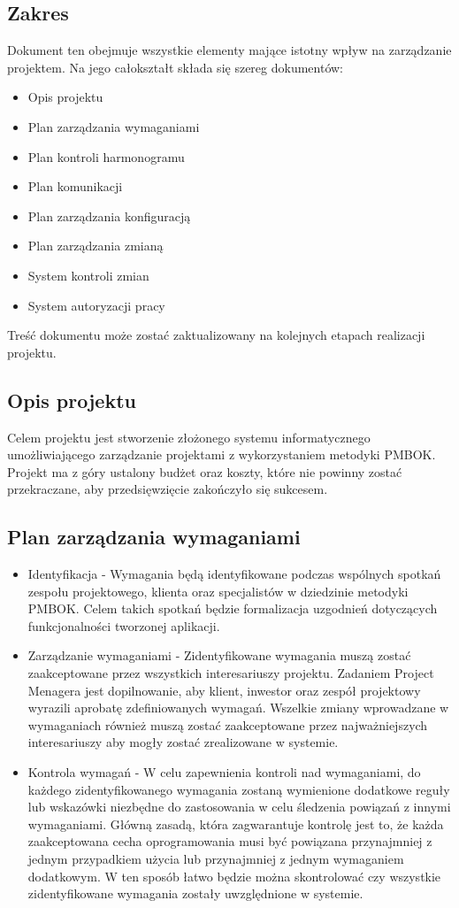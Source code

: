\subsection*{Zakres}
Dokument ten obejmuje wszystkie elementy mające istotny wpływ na zarządzanie projektem.
Na jego całokształt składa się szereg dokumentów:
\begin{itemize}
	\item Opis projektu
	\item Plan zarządzania wymaganiami
	\item Plan kontroli harmonogramu
	\item Plan komunikacji
	\item Plan zarządzania konfiguracją
	\item Plan zarządzania zmianą
	\item System kontroli zmian
	\item System autoryzacji pracy
\end{itemize}
Treść dokumentu może zostać zaktualizowany na kolejnych etapach realizacji projektu.

\subsection*{Opis projektu}
Celem projektu jest stworzenie złożonego systemu informatycznego umożliwiającego zarządzanie projektami z wykorzystaniem metodyki PMBOK. Projekt ma z góry ustalony budżet oraz koszty, które nie powinny zostać przekraczane, aby przedsięwzięcie zakończyło się sukcesem.

\subsection*{Plan zarządzania wymaganiami}
\begin{itemize}
	\item Identyfikacja - Wymagania będą identyfikowane podczas wspólnych spotkań zespołu projektowego, klienta oraz specjalistów w dziedzinie metodyki PMBOK. Celem takich spotkań będzie formalizacja uzgodnień dotyczących funkcjonalności tworzonej aplikacji.
	\item Zarządzanie wymaganiami - Zidentyfikowane wymagania muszą zostać zaakceptowane przez wszystkich interesariuszy projektu. Zadaniem Project Menagera jest dopilnowanie, aby klient, inwestor oraz zespół projektowy wyrazili aprobatę zdefiniowanych wymagań. Wszelkie zmiany wprowadzane w wymaganiach również muszą zostać zaakceptowane przez najważniejszych interesariuszy aby mogły zostać zrealizowane w systemie.
	\item Kontrola wymagań - W celu zapewnienia kontroli nad wymaganiami, do każdego zidentyfikowanego wymagania zostaną wymienione dodatkowe reguły lub wskazówki niezbędne do zastosowania w celu śledzenia powiązań z innymi wymaganiami. Główną zasadą, która zagwarantuje kontrolę jest to, że każda zaakceptowana cecha oprogramowania musi być powiązana przynajmniej z jednym przypadkiem użycia lub przynajmniej z jednym wymaganiem dodatkowym. W ten sposób łatwo będzie można skontrolować czy wszystkie zidentyfikowane wymagania zostały uwzględnione w systemie.
\end{itemize}

